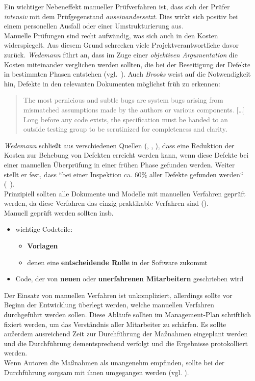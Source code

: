 \noindent
Ein wichtiger Nebeneffekt manueller Prüfverfahren ist, dass sich der Prüfer \textit{intensiv} mit dem Prüfgegenstand \textit{auseinandersetzt}.
Dies wirkt sich positiv bei einem personellen Ausfall oder einer Umstrukturierung aus.\\

\noindent
Manuelle Prüfungen sind recht aufwändig, was sich auch in den Kosten widerspiegelt.
Aus diesem Grund schrecken viele Projektverantwortliche davor zurück. \textit{Wedemann} führt an, dass im Zuge einer \textit{objektiven Argumentation} die Kosten miteinander verglichen werden sollten, die bei der Beseitigung der Defekte in bestimmten Phasen entstehen (vgl.~\cite[16]{Wed09c}).
Auch \textit{Brooks} weist auf die Notwendigkeit hin, Defekte in den relevanten Dokumenten möglichst früh zu erkennen:

\blockquote[{\cite[142]{Bro95}}]{
The most pernicious and subtle bugs are system bugs arising from mismatched assumptions made by the authors or various components. [\ldots] Long before any code exists, the specification must be handed to an outside testing group to be scrutinized for completeness and clarity.
}

\noindent
\textit{Wedemann} schließt aus verschiedenen Quellen (\cite{Rad01}, \cite{Wie02}, \cite{GG93}), dass eine Reduktion der Kosten zur Behebung von Defekten erreicht werden kann, wenn diese Defekte bei einer manuellen Überprüfung in einer frühen Phase gefunden werden.
Weiter stellt er fest,  dass ``bei einer Inspektion ca. 60{\%} aller Defekte gefunden werden`` (~\cite[16]{Wed09c}).\\

\noindent
Prinzipiell sollten alle Dokumente und Modelle mit manuellen Verfahren geprüft werden, da diese Verfahren das einzig praktikable Verfahren sind (\cite[16]{Wed09c}).\\
Manuell geprüft werden sollten insb.

\begin{itemize}
    \item wichtige Codeteile:
    \begin{itemize}
        \item \textbf{Vorlagen}
        \item denen eine \textbf{entscheidende Rolle} in der Software zukommt
    \end{itemize}
    \item Code, der von \textbf{neuen} oder \textbf{unerfahrenen Mitarbeitern} geschrieben wird
\end{itemize}

\noindent
Der Einsatz von manuellen Verfahren ist unkompliziert, allerdings sollte vor Beginn der Entwicklung überlegt werden, welche manuellen Verfahren durchgeführt werden sollen.
Diese Abläufe sollten im Management-Plan schriftlich fixiert werden, um das Verständnis aller Mitarbeiter zu schärfen.
Es sollte außerdem ausreichend Zeit zur Durchführung der Maßnahmen eingeplant werden und die Durchführung dementsprechend verfolgt und die Ergebnisse protokolliert werden.\\
Wenn Autoren die Maßnahmen als unangenehm empfinden, sollte bei der Durchführung sorgsam mit ihnen umgegangen werden (vgl. \cite[17]{Wed09c}).